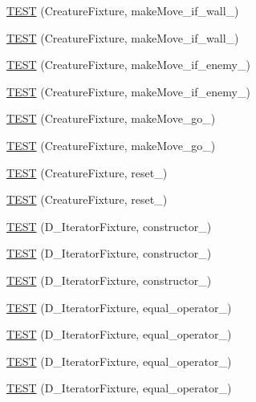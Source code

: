 \begin{DoxyCompactItemize}
\hyperlink{TestDarwin_8c_09_09_a104d97859a8d43b55ecfa6eedcdb5cdf}{T\-E\-S\-T} (Creature\-Fixture, make\-Move\-\_\-if\-\_\-wall\-\_)
\item 
\hyperlink{TestDarwin_8c_09_09_a888e9faa637609340eeff4bf620a02ee}{T\-E\-S\-T} (Creature\-Fixture, make\-Move\-\_\-if\-\_\-wall\-\_)
\item 
\hyperlink{TestDarwin_8c_09_09_a93ea7b5ca027bf45a4d920b5b90f613c}{T\-E\-S\-T} (Creature\-Fixture, make\-Move\-\_\-if\-\_\-enemy\-\_)
\item 
\hyperlink{TestDarwin_8c_09_09_a8a92fde6cbe242c5234ff821378a99bd}{T\-E\-S\-T} (Creature\-Fixture, make\-Move\-\_\-if\-\_\-enemy\-\_)
\item 
\hyperlink{TestDarwin_8c_09_09_ac28df4d8f78aa7f9b6e47ec35381a539}{T\-E\-S\-T} (Creature\-Fixture, make\-Move\-\_\-go\-\_)
\item 
\hyperlink{TestDarwin_8c_09_09_a3e255721c0243bf540db30621d5f339d}{T\-E\-S\-T} (Creature\-Fixture, make\-Move\-\_\-go\-\_)
\item 
\hyperlink{TestDarwin_8c_09_09_ad03035095268ae0cc7ada5cf3d99fc34}{T\-E\-S\-T} (Creature\-Fixture, reset\-\_)
\item 
\hyperlink{TestDarwin_8c_09_09_ae6cb8dfd7130adcd5d2e15c442d781a4}{T\-E\-S\-T} (Creature\-Fixture, reset\-\_)
\item 
\hyperlink{TestDarwin_8c_09_09_a18fc33997648126864731c7986fe9677}{T\-E\-S\-T} (D\-\_\-\-Iterator\-Fixture, constructor\-\_)
\item 
\hyperlink{TestDarwin_8c_09_09_a6717da78358997d79d6c5ea5cf908649}{T\-E\-S\-T} (D\-\_\-\-Iterator\-Fixture, constructor\-\_)
\item 
\hyperlink{TestDarwin_8c_09_09_abce87a0caab2667223e461f556c636bb}{T\-E\-S\-T} (D\-\_\-\-Iterator\-Fixture, constructor\-\_)
\item 
\hyperlink{TestDarwin_8c_09_09_a9b2c80a0d1c9245c9d5cf648d4fcf1eb}{T\-E\-S\-T} (D\-\_\-\-Iterator\-Fixture, equal\-\_\-operator\-\_)
\item 
\hyperlink{TestDarwin_8c_09_09_a81b02c6144dc1bc55ce3f1f7ebbff7fa}{T\-E\-S\-T} (D\-\_\-\-Iterator\-Fixture, equal\-\_\-operator\-\_)
\item 
\hyperlink{TestDarwin_8c_09_09_acf3a73abf9d5fadfad31ac927a7a88ab}{T\-E\-S\-T} (D\-\_\-\-Iterator\-Fixture, equal\-\_\-operator\-\_)
\item 
\hyperlink{TestDarwin_8c_09_09_aa3558f7aaed05205b47ff73ad9a118bd}{T\-E\-S\-T} (D\-\_\-\-Iterator\-Fixture, equal\-\_\-operator\-\_)
\item 

\end{DoxyCompactItemize}
